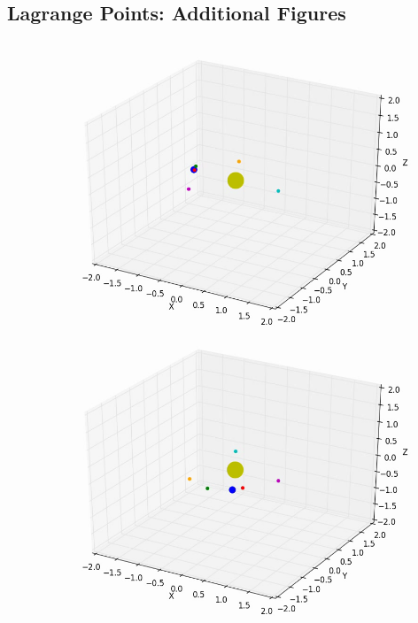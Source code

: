 \documentclass[10pt,letterpaper]{article}
\begin{document}
\subsection{Lagrange Points: Additional Figures}

\begin{figure}[!htb]
  \includegraphics[width=\linewidth]{figures/lagrange_points/lagrange_points_l2_vy_001_1.png}
  \subcaption{}\label{fig:lagrange_points_l2_vy_001_fig1}
\endminipage\hfill
{}
  \includegraphics[width=\linewidth]{figures/lagrange_points/lagrange_points_l2_vy_001_2.png}
  \subcaption{}\label{fig:lagrange_points_l2_vy_001_fig2}
\endminipage\hfill
{}%

\end{figure}
\end{document}
